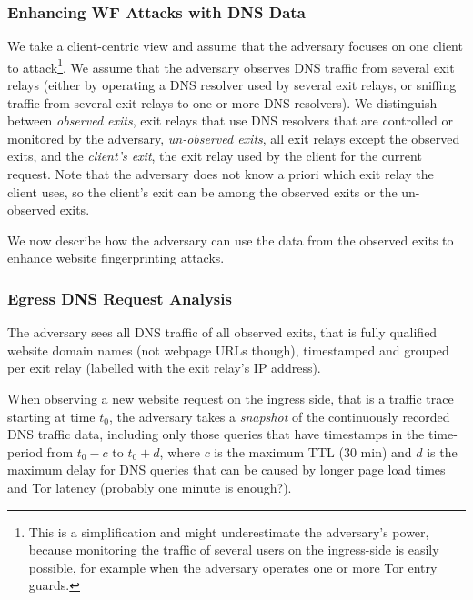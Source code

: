\subsubsection{Enhancing WF Attacks with DNS Data}

We take a client-centric view and assume that the adversary focuses on
one client to attack\footnote{This is a simplification and might underestimate
the adversary's power, because monitoring the traffic of several users
on the ingress-side is easily possible, for example when the adversary
operates one or more Tor entry guards.}.
%
We assume that the adversary observes DNS traffic from several exit
relays (either by operating a DNS resolver used by several exit relays,
or sniffing traffic from several exit relays to one or more DNS
resolvers).
%
We distinguish between \emph{observed exits}, \ie exit relays that use
DNS resolvers that are controlled or monitored by the adversary,
\emph{un-observed exits}, \ie all exit relays except the observed
exits, and the \emph{client's exit}, \ie the exit relay used by the
client for the current request.
%
Note that the adversary does not know a priori which exit relay the
client uses, so the client's exit can be among the observed exits or the
un-observed exits.

%
We now describe how the adversary can use the data from the observed
exits to enhance website fingerprinting attacks.


\subsubsection{Egress DNS Request Analysis}

The adversary sees all DNS traffic of all observed exits, that is fully
qualified website domain names (not webpage URLs though), timestamped
and grouped per exit relay (\eg labelled with the exit relay's IP
address).

When observing a new website request on the ingress side, that is a
traffic trace starting at time $t_0$, the adversary takes a \emph{snapshot}
of the continuously recorded DNS traffic data, including only those queries
that have timestamps in the time-period from $t_0 - c$ to $t_0 + d$,
where $c$ is the maximum TTL (30 min) and $d$ is the maximum delay
for DNS queries that can be caused by longer page load times and Tor
latency (probably one minute is enough?).

